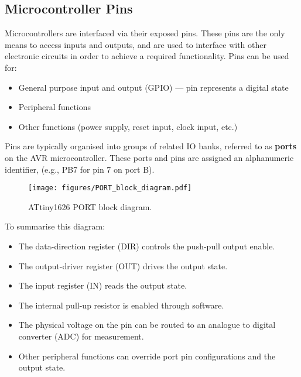 \documentclass{article}
\begin{document}
\subsection{Microcontroller Pins}
Microcontrollers are interfaced via their exposed pins. These pins are
the only means to access inputs and outputs, and are used to interface
with other electronic circuits in order to achieve a required
functionality. Pins can be used for:
\begin{itemize}
    \item General purpose input and output (GPIO) --- pin represents a
          digital state
    \item Peripheral functions
    \item Other functions (power supply, reset input, clock input,
          etc.)
\end{itemize}
Pins are typically organised into groups of related IO banks,
referred to as \textbf{ports} on the AVR microcontroller.
These ports and pins are assigned an alphanumeric identifier, (e.g., PB7 for pin 7 on port B).
\begin{figure}[H]
    \centering
    \texttt{[image: figures/PORT\_block\_diagram.pdf]}
    \caption{ATtiny1626 PORT block diagram.} %
\end{figure}
To summarise this diagram:
\begin{itemize}
    \item The data-direction register (DIR) controls the push-pull
          output enable.
    \item The output-driver register (OUT) drives the output state.
    \item The input register (IN) reads the output state.
    \item The internal pull-up resistor is enabled through software.
    \item The physical voltage on the pin can be routed to an analogue
          to digital converter (ADC) for measurement.
    \item Other peripheral functions can override port pin
          configurations and the output state.
\end{itemize}
\end{document}
